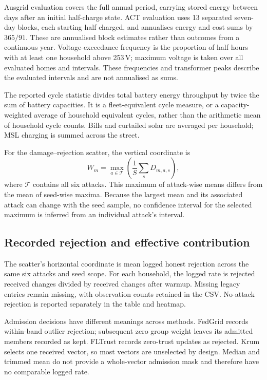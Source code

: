 \documentclass[preprint,12pt,a4paper]{elsarticle}
\begin{document}
Ausgrid evaluation covers the full annual period, carrying stored energy between days after an initial half-charge state. ACT evaluation uses 13 separated seven-day blocks, each starting half charged, and annualises energy and cost sums by $365/91$. These are annualised block estimates rather than outcomes from a continuous year. Voltage-exceedance frequency is the proportion of half hours with at least one household above 253\,V; maximum voltage is taken over all evaluated homes and intervals. These frequencies and transformer peaks describe the evaluated intervals and are not annualised as sums.

The reported cycle statistic divides total battery energy throughput by twice the sum of battery capacities. It is a fleet-equivalent cycle measure, or a capacity-weighted average of household equivalent cycles, rather than the arithmetic mean of household cycle counts. Bills and curtailed solar are averaged per household; MSL charging is summed across the street.

For the damage--rejection scatter, the vertical coordinate is
\begin{equation}
W_m=\max_{a\in\mathcal T}\left(\frac{1}{S}\sum_sD_{m,a,s}\right),
\end{equation}
where $\mathcal T$ contains all six attacks. This maximum of attack-wise means differs from the mean of seed-wise maxima. Because the largest mean and its associated attack can change with the seed sample, no confidence interval for the selected maximum is inferred from an individual attack's interval.

\subsection{Recorded rejection and effective contribution}
\label{sec:participation}
The scatter's horizontal coordinate is mean logged honest rejection across the same six attacks and seed scope. For each household, the logged rate is rejected received changes divided by received changes after warmup. Missing legacy entries remain missing, with observation counts retained in the CSV. No-attack rejection is reported separately in the table and heatmap.

Admission decisions have different meanings across methods. FedGrid records within-band outlier rejection; subsequent zero group weight leaves its admitted members recorded as kept. FLTrust records zero-trust updates as rejected. Krum selects one received vector, so most vectors are unselected by design. Median and trimmed mean do not provide a whole-vector admission mask and therefore have no comparable logged rate.
\end{document}
